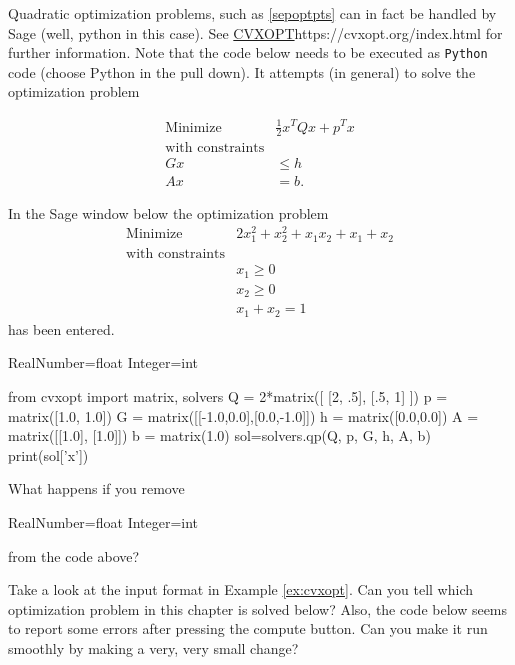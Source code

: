 \documentclass{article}
\begin{document}
    
    \begin{example}\label{ex:cvxopt}
      Quadratic optimization problems, such as \eqref{sepoptpts} can in fact be handled by Sage (well, python
      in this case). See
      \url{CVXOPT}{https://cvxopt.org/index.html} for
      further information.  Note that the code below needs to be
      executed as \texttt{Python} code (choose Python in the pull
      down). It attempts (in general) to solve the optimization
      problem
      
    \begin{align*} 
    \text{Minimize}\qquad\quad &\frac{1}{2} x^T Q x + p^T x\\
     \text{with constraints}&\\
    G x &\leq h\\
    A x  &= b.
    \end{align*}


    
    In the Sage window below the optimization problem
\begin{align*} 
    \text{Minimize}\qquad\quad &2 x_1^2 + x_2^2 + x_1 x_2 + x_1 + x_2\\
  \text{with constraints}&\\
                               &x_1 \geq 0\\
                               &x_2 \geq 0\\
  &x_1 + x_2 = 1
    \end{align*}
    has been entered.
      
\begin{sage}
RealNumber=float
Integer=int

from cvxopt import matrix, solvers
Q = 2*matrix([ [2, .5], [.5, 1] ])
p = matrix([1.0, 1.0])
G = matrix([[-1.0,0.0],[0.0,-1.0]])
h = matrix([0.0,0.0])
A = matrix([[1.0], [1.0]])
b = matrix(1.0)
sol=solvers.qp(Q, p, G, h, A, b)
print(sol['x'])
\end{sage}

What happens if you remove
\begin{code}
RealNumber=float
Integer=int
\end{code}
from the code above?
\end{example}

\beginshex
Take a look at the input format in Example \ref{ex:cvxopt}. Can you tell which
optimization problem in this chapter is solved below? Also, the code below seems to report some errors after pressing the compute button. Can you make it run smoothly by making a very, very
small change?
\end{document}
